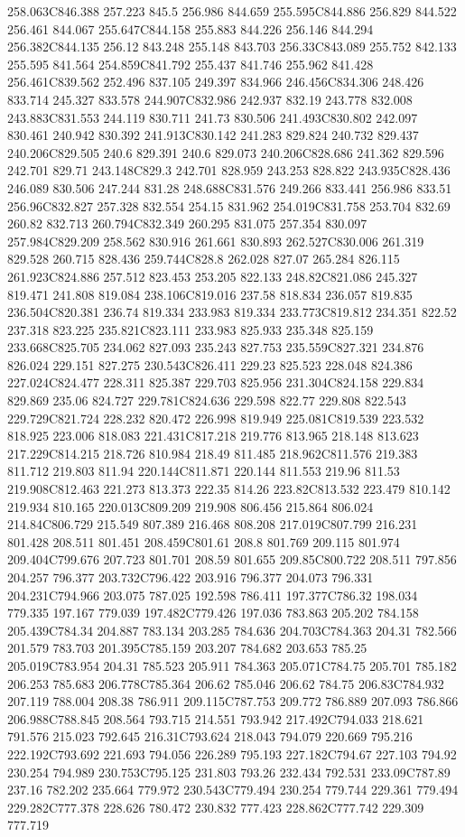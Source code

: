 258.063C846.388 257.223 845.5 256.986 844.659 255.595C844.886 256.829 844.522 256.461 844.067 255.647C844.158 255.883 844.226 256.146 844.294 256.382C844.135 256.12 843.248 255.148 843.703 256.33C843.089 255.752 842.133 255.595 841.564 254.859C841.792 255.437 841.746 255.962 841.428 256.461C839.562 252.496 837.105 249.397 834.966 246.456C834.306 248.426 833.714 245.327 833.578 244.907C832.986 242.937 832.19 243.778 832.008 243.883C831.553 244.119 830.711 241.73 830.506 241.493C830.802 242.097 830.461 240.942 830.392 241.913C830.142 241.283 829.824 240.732 829.437 240.206C829.505 240.6 829.391 240.6 829.073 240.206C828.686 241.362 829.596 242.701 829.71 243.148C829.3 242.701 828.959 243.253 828.822 243.935C828.436 246.089 830.506 247.244 831.28 248.688C831.576 249.266 833.441 256.986 833.51 256.96C832.827 257.328 832.554 254.15 831.962 254.019C831.758 253.704 832.69 260.82 832.713 260.794C832.349 260.295 831.075 257.354 830.097 257.984C829.209 258.562 830.916 261.661 830.893 262.527C830.006 261.319 829.528 260.715 828.436 259.744C828.8 262.028 827.07 265.284 826.115 261.923C824.886 257.512 823.453 253.205 822.133 248.82C821.086 245.327 819.471 241.808 819.084 238.106C819.016 237.58 818.834 236.057 819.835 236.504C820.381 236.74 819.334 233.983 819.334 233.773C819.812 234.351 822.52 237.318 823.225 235.821C823.111 233.983 825.933 235.348 825.159 233.668C825.705 234.062 827.093 235.243 827.753 235.559C827.321 234.876 826.024 229.151 827.275 230.543C826.411 229.23 825.523 228.048 824.386 227.024C824.477 228.311 825.387 229.703 825.956 231.304C824.158 229.834 829.869 235.06 824.727 229.781C824.636 229.598 822.77 229.808 822.543 229.729C821.724 228.232 820.472 226.998 819.949 225.081C819.539 223.532 818.925 223.006 818.083 221.431C817.218 219.776 813.965 218.148 813.623 217.229C814.215 218.726 810.984 218.49 811.485 218.962C811.576 219.383 811.712 219.803 811.94 220.144C811.871 220.144 811.553 219.96 811.53 219.908C812.463 221.273 813.373 222.35 814.26 223.82C813.532 223.479 810.142 219.934 810.165 220.013C809.209 219.908 806.456 215.864 806.024 214.84C806.729 215.549 807.389 216.468 808.208 217.019C807.799 216.231 801.428 208.511 801.451 208.459C801.61 208.8 801.769 209.115 801.974 209.404C799.676 207.723 801.701 208.59 801.655 209.85C800.722 208.511 797.856 204.257 796.377 203.732C796.422 203.916 796.377 204.073 796.331 204.231C794.966 203.075 787.025 192.598 786.411 197.377C786.32 198.034 779.335 197.167 779.039 197.482C779.426 197.036 783.863 205.202 784.158 205.439C784.34 204.887 783.134 203.285 784.636 204.703C784.363 204.31 782.566 201.579 783.703 201.395C785.159 203.207 784.682 203.653 785.25 205.019C783.954 204.31 785.523 205.911 784.363 205.071C784.75 205.701 785.182 206.253 785.683 206.778C785.364 206.62 785.046 206.62 784.75 206.83C784.932 207.119 788.004 208.38 786.911 209.115C787.753 209.772 786.889 207.093 786.866 206.988C788.845 208.564 793.715 214.551 793.942 217.492C794.033 218.621 791.576 215.023 792.645 216.31C793.624 218.043 794.079 220.669 795.216 222.192C793.692 221.693 794.056 226.289 795.193 227.182C794.67 227.103 794.92 230.254 794.989 230.753C795.125 231.803 793.26 232.434 792.531 233.09C787.89 237.16 782.202 235.664 779.972 230.543C779.494 230.254 779.744 229.361 779.494 229.282C777.378 228.626 780.472 230.832 777.423 228.862C777.742 229.309 777.719 